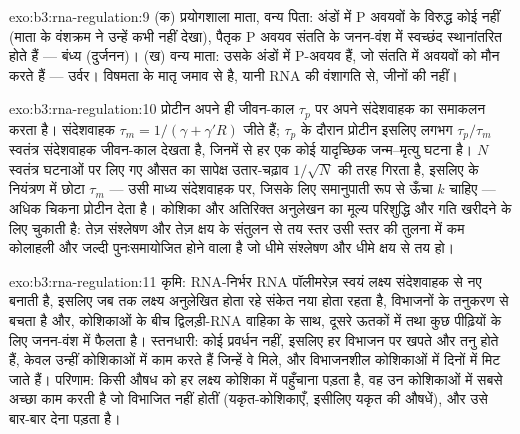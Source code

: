 \begin{solution}{exo:b3:rna-regulation:9}
(क) प्रयोगशाला माता, वन्य पिता: अंडों में P अवयवों के विरुद्ध कोई
 नहीं (माता के वंशक्रम ने उन्हें कभी नहीं देखा), पैतृक P अवयव
संतति के जनन-वंश में स्वच्छंद स्थानांतरित होते हैं --- बंध्य
(दुर्जनन)। (ख) वन्य माता: उसके अंडों में P-अवयव  हैं, जो संतति
में अवयवों को मौन करते हैं --- उर्वर। विषमता  के मातृ जमाव से है,
यानी RNA की वंशागति से, जीनों की नहीं।
\end{solution}

\begin{solution}{exo:b3:rna-regulation:10}
प्रोटीन अपने ही जीवन-काल $\tau_{p}$ पर अपने संदेशवाहक का समाकलन करता है।
संदेशवाहक $\tau_{m} = 1/(\gamma + \gamma' R)$ जीते हैं; $\tau_{p}$ के
दौरान प्रोटीन इसलिए लगभग $\tau_{p}/\tau_{m}$ स्वतंत्र संदेशवाहक
जीवन-काल देखता है, जिनमें से हर एक कोई यादृच्छिक जन्म--मृत्यु घटना है।
$N$ स्वतंत्र घटनाओं पर लिए गए औसत का सापेक्ष उतार-चढ़ाव
$1/\sqrt{N}$ की तरह गिरता है, इसलिए  के नियंत्रण में छोटा
$\tau_{m}$ --- उसी माध्य संदेशवाहक पर, जिसके लिए समानुपाती रूप से ऊँचा
$k$ चाहिए --- अधिक चिकना प्रोटीन देता है। कोशिका  और
अतिरिक्त अनुलेखन का मूल्य परिशुद्धि और गति खरीदने के लिए चुकाती है:
तेज़ संश्लेषण और तेज़ क्षय के संतुलन से तय स्तर उसी स्तर की तुलना में
कम कोलाहली और जल्दी पुनःसमायोजित होने वाला है जो धीमे संश्लेषण और धीमे
क्षय से तय हो।
\end{solution}

\begin{solution}{exo:b3:rna-regulation:11}
कृमि: RNA-निर्भर RNA पॉलीमरेज़ स्वयं लक्ष्य संदेशवाहक से नए 
बनाती है, इसलिए जब तक लक्ष्य अनुलेखित होता रहे संकेत नया होता रहता है,
विभाजनों के तनुकरण से बचता है और, कोशिकाओं के बीच द्विलड़ी-RNA वाहिका
के साथ, दूसरे ऊतकों में तथा कुछ पीढ़ियों के लिए जनन-वंश में फैलता है।
स्तनधारी: कोई प्रवर्धन नहीं, इसलिए  हर विभाजन पर खपते और तनु होते
हैं, केवल उन्हीं कोशिकाओं में काम करते हैं जिन्हें वे मिले, और
विभाजनशील कोशिकाओं में दिनों में मिट जाते हैं। परिणाम: किसी  औषध
को हर लक्ष्य कोशिका में पहुँचाना पड़ता है, वह उन कोशिकाओं में सबसे
अच्छा काम करती है जो विभाजित नहीं होतीं (यकृत-कोशिकाएँ, इसीलिए यकृत की
औषधें), और उसे बार-बार देना पड़ता है।
\end{solution}

